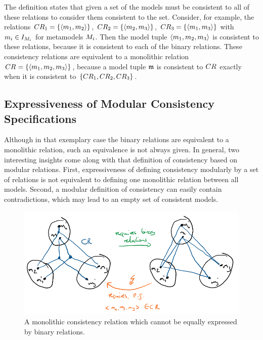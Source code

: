 The definition states that given a set of \modellevelconsistencyrelations the models must be consistent to all of these relations to consider them consistent to the set.
Consider, for example, the relations $CR_{1} = \{ \langle m_{1}, m_{2} \rangle \}$, $CR_{2} = \{ \langle m_{2},m_{3} \rangle \}$, $CR_{3} = \{ \langle m_{1}, m_{3} \rangle \}$ with $m_{i} \in I_{M_{i}}$ for metamodels $M_{i}$. Then the model tuple $\langle m_{1}, m_{2}, m_{3} \rangle$ is consistent to these relations, because it is consistent to each of the binary relations.
These consistency relations are equivalent to a monolithic relation $CR_{} = \{ \langle m_{1}, m_{2}, m_{3} \rangle \}$, because a model tuple $\mathfrak{m}$ is consistent to $CR_{}$ exactly when it is consistent to $\{ CR_{1}, CR_{2}, CR_{3} \}$.


\subsection{Expressiveness of Modular Consistency Specifications}

Although in that exemplary case the binary relations are equivalent to a monolithic relation, such an equivalence is not always given. In general, two interesting insights come along with that definition of consistency based on modular relations. First, expressiveness of defining consistency modularly by a set of relations is not equivalent to defining one monolithic relation between all models. Second, a modular definition of consistency can easily contain contradictions, which may lead to an empty set of consistent models.

\begin{figure}
    \centering
    \includegraphics[width=\textwidth]{figures/correctness/notion/binary_definable.png}
    \caption[Modular consistency relation that cannot be modularized]{A monolithic consistency relation which cannot be equally expressed by binary relations.}
    \label{fig:correctness:notion:binary_definable}
\end{figure}

